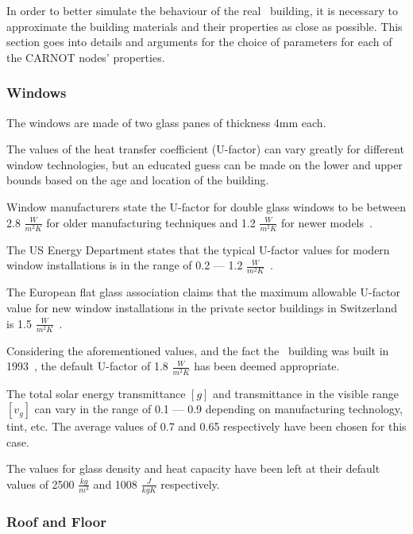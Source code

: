 In order to better simulate the behaviour of the real \pdome\ building, it is
necessary to approximate the building materials and their properties as close as
possible. This section goes into details and arguments for the choice of
parameters for each of the CARNOT nodes' properties.

\subsubsection{Windows}

The windows are made of two glass panes of thickness 4mm each.

The values of the heat transfer coefficient (U-factor) can vary greatly for
different window technologies, but an educated guess can be made on the lower
and upper bounds based on the age and location of the building. 

Window manufacturers state
the U-factor for double glass windows to be between 2.8 \(\frac{W}{m^2K}\) for
older manufacturing techniques and 1.2 \(\frac{W}{m^2K}\) for newer
models~\cite{WhatAreTypical2018}. 

The US Energy Department states that the
typical U-factor values for modern window installations is in the range of 0.2
--- 1.2 \(\frac{W}{m^2K}\)~\cite{GuideEnergyEfficientWindows}. 

The European flat glass association claims that the maximum allowable U-factor
value for new window installations in the private sector buildings in
Switzerland is 1.5
\(\frac{W}{m^2K}\)~\cite{glassforeuropeMinimumPerformanceRequirements2018}.

Considering the aforementioned values, and the fact the \pdome\ building was
built in 1993~\cite{nattererModelingMultilayerBeam2008}, the default U-factor of
1.8 \(\frac{W}{m^2K}\) has been deemed appropriate.

The total solar energy transmittance $[g]$ and transmittance in the visible
range $[v_g]$ can vary in the range of 0.1 --- 0.9 depending on manufacturing
technology, tint, etc. The average values of 0.7 and 0.65 respectively have been
chosen for this case.

The values for glass density and heat capacity have been left at their default
values of 2500 \(\frac{kg}{m^3}\) and 1008 \(\frac{J}{kgK}\) respectively.

\subsubsection{Roof and Floor}

